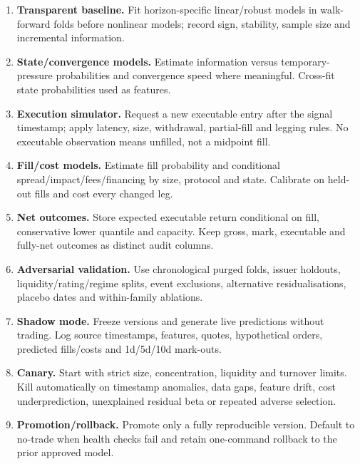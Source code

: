 \documentclass[10pt]{article}
\begin{document}
\begin{enumerate}[leftmargin=2em,label=\textbf{A\arabic*.}]
\item \textbf{Transparent baseline.} Fit horizon-specific linear/robust models in walk-forward folds before nonlinear models; record sign, stability, sample size and incremental information.
\item \textbf{State/convergence models.} Estimate information versus temporary-pressure probabilities and convergence speed where meaningful. Cross-fit state probabilities used as features.
\item \textbf{Execution simulator.} Request a new executable entry after the signal timestamp; apply latency, size, withdrawal, partial-fill and legging rules. No executable observation means unfilled, not a midpoint fill.
\item \textbf{Fill/cost models.} Estimate fill probability and conditional spread/impact/fees/financing by size, protocol and state. Calibrate on held-out fills and cost every changed leg.
\item \textbf{Net outcomes.} Store expected executable return conditional on fill, conservative lower quantile and capacity. Keep gross, mark, executable and fully-net outcomes as distinct audit columns.
\item \textbf{Adversarial validation.} Use chronological purged folds, issuer holdouts, liquidity/rating/regime splits, event exclusions, alternative residualisations, placebo dates and within-family ablations.
\item \textbf{Shadow mode.} Freeze versions and generate live predictions without trading. Log source timestamps, features, quotes, hypothetical orders, predicted fills/costs and 1d/5d/10d mark-outs.
\item \textbf{Canary.} Start with strict size, concentration, liquidity and turnover limits. Kill automatically on timestamp anomalies, data gaps, feature drift, cost underprediction, unexplained residual beta or repeated adverse selection.
\item \textbf{Promotion/rollback.} Promote only a fully reproducible version. Default to no-trade when health checks fail and retain one-command rollback to the prior approved model.
\end{enumerate}
\end{document}
